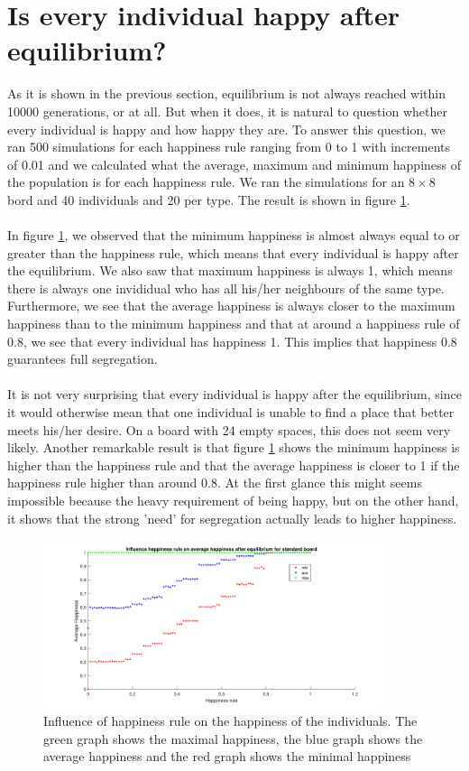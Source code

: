 
\section{Is every individual happy after equilibrium?}
As it is shown in the previous section, equilibrium is not always reached within 10000 generations, or at all. 
But when it does, it is natural to question whether every individual is happy and how happy they are. 
To answer this question, we ran 500 simulations for each happiness rule ranging from 0 to 1 with increments of 0.01 and we calculated what the average, maximum and minimum happiness of the population is for each happiness rule. 
We ran the simulations for an $8\times 8$ bord and 40 individuals and 20 per type. 
The result is shown in figure \ref{happyhappy}.\\
\\
In figure \ref{happyhappy}, we observed that the minimum happiness is almost always equal to or greater than the happiness rule, which means that every individual is happy after the equilibrium. 
We also saw that maximum happiness is always 1, which means there is always one invididual who has all his/her neighbours of the same type. 
Furthermore, we see that the average happiness is always closer to the maximum happiness than to the minimum happiness and that at around a happiness rule of 0.8, we see that every individual has happiness 1. 
This implies that happiness 0.8 guarantees full segregation.\\
\\
It is not very surprising that every individual is happy after the equilibrium, since it would otherwise mean that one individual is unable to find a place that better meets his/her desire. 
On a board with 24 empty spaces, this does not seem very likely. 
Another remarkable result is that figure \ref{happyhappy} shows the minimum happiness is higher than the happiness rule and that the average happiness is closer to 1 if the happiness rule higher than around 0.8. 
At the first glance this might seems impossible because the heavy requirement of being happy, but on the other hand, it shows that the strong 'need' for segregation actually leads to higher happiness.
\begin{figure}[h!]
    \centering
    \includegraphics[width=0.9\textwidth]{happinessregel-gemhappinesseind-2.pdf}
    \caption{Influence of happiness rule on the happiness of the individuals. The green graph shows the maximal happiness, the blue graph shows the average happiness and the red graph shows the minimal happiness}
    \label{happyhappy}
\end{figure}
